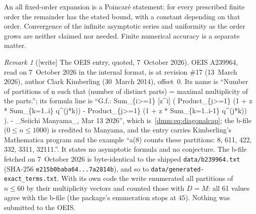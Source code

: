 \documentclass[11pt,letterpaper]{article}
\numberwithin{equation}{section}
\theoremstyle{definition}\newtheorem{definition}[theorem]{Definition}
\theoremstyle{remark}\newtheorem{remark}[theorem]{Remark}
\newcommand{\file}[1]{\nolinkurl{#1}}
\begin{document}
An all fixed-order expansion is a Poincar\'e statement: for every prescribed finite order the remainder has the stated bound, with a constant depending on that order. Convergence of the infinite asymptotic series and uniformity as the order grows are neither claimed nor needed. Finite numerical accuracy is a separate matter.

\begin{remark}[{[write]} The OEIS entry, quoted, 7~October 2026]\label{dmm:rem:oeis}
OEIS A239964, read on 7~October 2026 in the internal format, is at revision
\#17 (13~March 2026), author Clark Kimberling (30~March 2014), offset~0.
Its name is ``Number of partitions of n such that (number of distinct parts)
= maximal multiplicity of the parts.''; its formula line is ``G.f.:
Sum\_\{i>=1\} [z\^{}i] ( Product\_\{j>=1\} (1 + z * Sum\_\{k=1..i\}
q\^{}(j*k)) - Product\_\{j>=1\} (1 + z * Sum\_\{k=1..i-1\} q\^{}(j*k)) ). -
\_Seiichi Manyama\_, Mar 13 2026'', which is~\eqref{dmm:eq:diagonalcap}; the
b-file ($0\le n\le1000$) is credited to Manyama, and the entry carries
Kimberling's Mathematica program and the example ``a(8) counts these
partitions: 8, 611, 422, 332, 3311, 32111.''. It states no asymptotic formula
and no conjecture. The b-file fetched on 7~October 2026 is byte-identical to
the shipped \file{data/b239964.txt} (SHA-256 \file{e215b0baba64...7a2814b}),
and so to \file{data/generated-exact_terms.txt}. With its own code the write
enumerated all partitions of $n\le60$ by their multiplicity vectors and
counted those with $D=M$: all 61 values agree with the b-file (the package's
enumeration stops at $45$). Nothing was submitted to the OEIS.
\end{remark}
\end{document}
